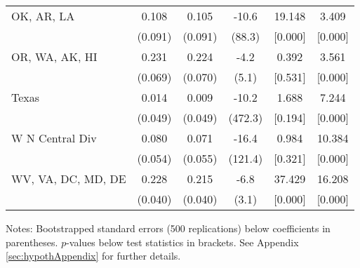 \begin{landscape}
\begin{table}[ht]
{\begin{threeparttable}
\begin{tabular}{lccccc}
OK, AR, LA & 0.108 & 0.105 & -10.6 & 19.148 & 3.409 \\ 
 & (0.091) & (0.091) & (88.3) & [0.000] & [0.000] \\ 
OR, WA, AK, HI & 0.231 & 0.224 & -4.2 & 0.392 & 3.561 \\ 
 & (0.069) & (0.070) & (5.1) & [0.531] & [0.000] \\ 
Texas & 0.014 & 0.009 & -10.2 & 1.688 & 7.244 \\ 
 & (0.049) & (0.049) & (472.3) & [0.194] & [0.000] \\ 
W N Central Div & 0.080 & 0.071 & -16.4 & 0.984 & 10.384 \\ 
 & (0.054) & (0.055) & (121.4) & [0.321] & [0.000] \\ 
WV, VA, DC, MD, DE & 0.228 & 0.215 & -6.8 & 37.429 & 16.208 \\ 
 & (0.040) & (0.040) & (3.1) & [0.000] & [0.000] \\ 
\bottomrule
\end{tabular}
{\footnotesize {\raggedright Notes: Bootstrapped standard errors (500 replications) below coefficients in parentheses. $p$-values below test statistics in brackets. See Appendix \ref{sec:hypothAppendix} for further details.}}
\end{threeparttable}
}
\end{table}
\end{landscape}
